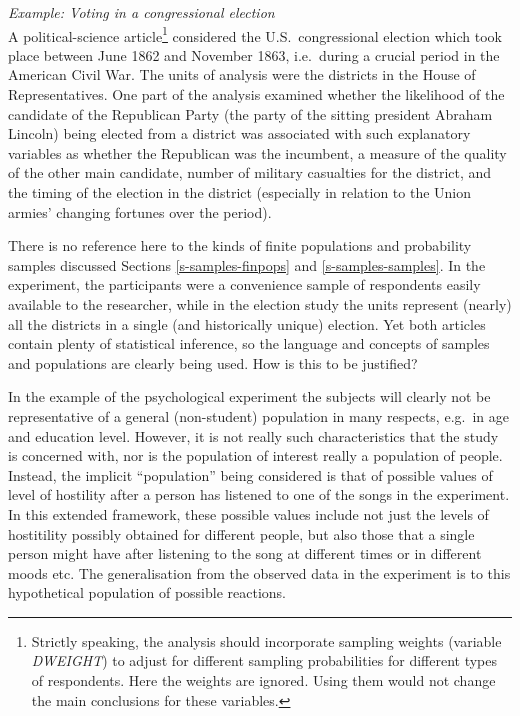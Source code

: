 \documentclass[11pt,a4paper,openany]{book}
\let\rmarkdownfootnote\footnote%
\def\footnote{\protect\rmarkdownfootnote}
\begin{document}
\emph{Example: Voting in a congressional election}\\
A political-science article\footnote{Strictly speaking, the analysis
  should incorporate sampling weights (variable \emph{DWEIGHT}) to
  adjust for different sampling probabilities for different types of
  respondents. Here the weights are ignored. Using them would not change
  the main conclusions for these variables.} considered the
U.S.~congressional election which took place between June 1862 and
November 1863, i.e.~during a crucial period in the American Civil War.
The units of analysis were the districts in the House of
Representatives. One part of the analysis examined whether the
likelihood of the candidate of the Republican Party (the party of the
sitting president Abraham Lincoln) being elected from a district was
associated with such explanatory variables as whether the Republican was
the incumbent, a measure of the quality of the other main candidate,
number of military casualties for the district, and the timing of the
election in the district (especially in relation to the Union armies'
changing fortunes over the period).

There is no reference here to the kinds of finite populations and
probability samples discussed Sections \ref{s-samples-finpops} and
\ref{s-samples-samples}. In the experiment, the participants were a
convenience sample of respondents easily available to the researcher,
while in the election study the units represent (nearly) all the
districts in a single (and historically unique) election. Yet both
articles contain plenty of statistical inference, so the language and
concepts of samples and populations are clearly being used. How is this
to be justified?

In the example of the psychological experiment the subjects will clearly
not be representative of a general (non-student) population in many
respects, e.g.~in age and education level. However, it is not really
such characteristics that the study is concerned with, nor is the
population of interest really a population of people. Instead, the
implicit ``population'' being considered is that of possible values of
level of hostility after a person has listened to one of the songs in
the experiment. In this extended framework, these possible values
include not just the levels of hostitility possibly obtained for
different people, but also those that a single person might have after
listening to the song at different times or in different moods etc. The
generalisation from the observed data in the experiment is to this
hypothetical population of possible reactions.
\end{document}
